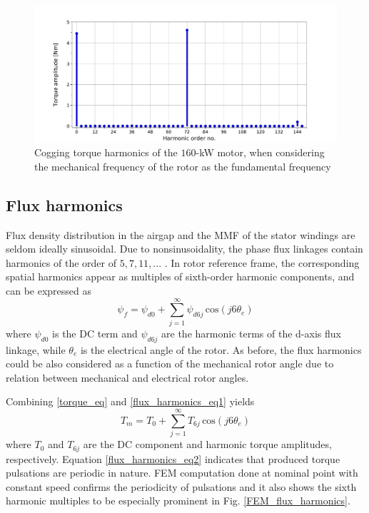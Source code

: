 

\begin{figure}[htb] 
    \centering
    \includegraphics[width=1.0\linewidth]{images/cogging_harmonics.pdf} 
    \caption{Cogging torque harmonics of the $160$-kW motor, when considering the mechanical frequency of the rotor as the fundamental frequency}
    \label{FEM_cogging_harmonics}
\end{figure}

\subsection{Flux harmonics}

Flux density distribution in the airgap and the MMF of the stator windings are seldom ideally sinusoidal. Due to nonsinusoidality, the phase flux linkages contain harmonics of the order of $5,7,11,...$ \cite{TRR_SW:1998}. In rotor reference frame, the corresponding spatial harmonics appear as multiples of sixth-order harmonic components, and can be expressed as \cite{ILC:2004, ILC:2005, ILC:2018}
\begin{equation}
    \psi_{f} = \psi_{d0} + \sum_{j=\text{1}}^{\infty} \psi_{d6j} \, \text{cos}(j6\theta_e)
    \label{flux_harmonics_eq1}
\end{equation}
where $\psi_{d0}$ is the DC term and $\psi_{d6j}$ are the harmonic terms of the d-axis flux linkage, while $\theta_e$ is the electrical angle of the rotor. As before, the flux harmonics could be also considered as a function of the mechanical rotor angle due to relation between mechanical and electrical rotor angles.

Combining \eqref{torque_eq} and \eqref{flux_harmonics_eq1} yields
\begin{equation}
    T_m = T_0 + \sum_{j=\text{1}}^{\infty} T_{6j} \, \text{cos}(j6\theta_e)
    \label{flux_harmonics_eq2}
\end{equation}
where $T_0$ and $T_{6j}$ are the DC component and harmonic torque amplitudes, respectively. Equation \eqref{flux_harmonics_eq2} indicates that produced torque pulsations are periodic in nature. FEM computation done at nominal point with constant speed confirms the periodicity of pulsations and it also shows the sixth harmonic multiples to be especially prominent in Fig. \ref{FEM_flux_harmonics}.

